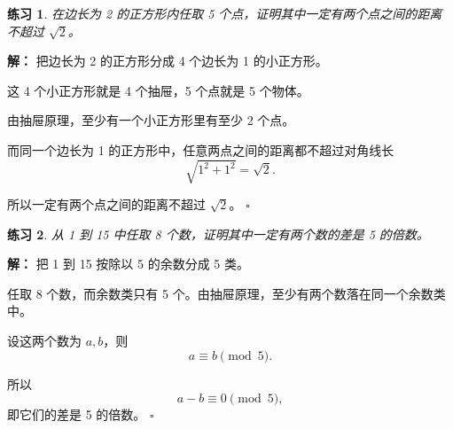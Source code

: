 \documentclass[11pt,a4paper,fontset=fandol]{ctexart}
\theoremstyle{formaltheorem}
\theoremstyle{formalexample}
\newtheorem{exercise}{练习}[section]
\newenvironment{solution}{\par\noindent\textbf{解：}}{\hfill$\square$\par}
\begin{document}
\begin{exercise}
在边长为 2 的正方形内任取 5 个点，证明其中一定有两个点之间的距离不超过 $\sqrt{2}$。
\end{exercise}

\begin{solution}
把边长为 2 的正方形分成 4 个边长为 1 的小正方形。

这 4 个小正方形就是 4 个抽屉，5 个点就是 5 个物体。

由抽屉原理，至少有一个小正方形里有至少 2 个点。

而同一个边长为 1 的正方形中，任意两点之间的距离都不超过对角线长
\[
\sqrt{1^2+1^2}=\sqrt{2}.
\]

所以一定有两个点之间的距离不超过 $\sqrt{2}$。
\end{solution}

\begin{exercise}
从 1 到 15 中任取 8 个数，证明其中一定有两个数的差是 5 的倍数。
\end{exercise}

\begin{solution}
把 1 到 15 按除以 5 的余数分成 5 类。

任取 8 个数，而余数类只有 5 个。由抽屉原理，至少有两个数落在同一个余数类中。

设这两个数为 $a,b$，则
\[
a\equiv b\pmod 5.
\]

所以
\[
a-b\equiv 0\pmod 5,
\]
即它们的差是 5 的倍数。
\end{solution}
\end{document}
